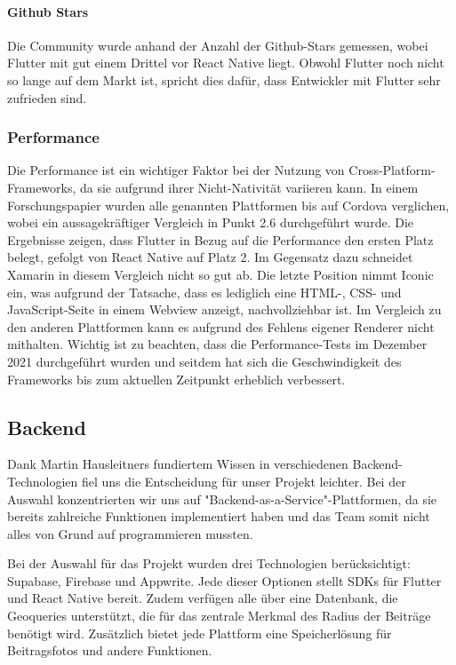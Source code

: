 \paragraph{Github Stars}
Die Community wurde anhand der Anzahl der Github-Stars gemessen, wobei Flutter mit gut einem Drittel vor React Native liegt. Obwohl Flutter noch nicht so lange auf dem Markt ist, spricht dies dafür, dass Entwickler mit Flutter sehr zufrieden sind.

\subsubsection{Performance}
Die Performance ist ein wichtiger Faktor bei der Nutzung von Cross-Platform-Frameworks, da sie aufgrund ihrer Nicht-Nativität variieren kann. In einem Forschungspapier \cite{Anwar2021} wurden alle genannten Plattformen bis auf Cordova verglichen, wobei ein aussagekräftiger Vergleich in Punkt 2.6 durchgeführt wurde. Die Ergebnisse zeigen, dass Flutter in Bezug auf die Performance den ersten Platz belegt, gefolgt von React Native auf Platz 2. Im Gegensatz dazu schneidet Xamarin in diesem Vergleich nicht so gut ab. Die letzte Position nimmt Iconic ein, was aufgrund der Tatsache, dass es lediglich eine HTML-, CSS- und JavaScript-Seite in einem Webview anzeigt, nachvollziehbar ist. Im Vergleich zu den anderen Plattformen kann es aufgrund des Fehlens eigener Renderer nicht mithalten.
Wichtig ist zu beachten, dass die Performance-Tests im Dezember 2021 durchgeführt wurden und seitdem hat sich die Geschwindigkeit des Frameworks bis zum aktuellen Zeitpunkt erheblich verbessert.


\subsection
{Backend}
Dank Martin Hausleitners fundiertem Wissen in verschiedenen Backend-Technologien fiel uns die Entscheidung für unser Projekt leichter. Bei der Auswahl konzentrierten wir uns auf "Backend-as-a-Service"-Plattformen, da sie bereits zahlreiche Funktionen implementiert haben und das Team somit nicht alles von Grund auf programmieren mussten.

Bei der Auswahl für das Projekt wurden drei Technologien berücksichtigt: Supabase, Firebase und Appwrite. Jede dieser Optionen stellt SDKs für Flutter und React Native bereit. Zudem verfügen alle über eine Datenbank, die Geoqueries unterstützt, die für das zentrale Merkmal des Radius der Beiträge benötigt wird. Zusätzlich bietet jede Plattform eine Speicherlösung für Beitragsfotos und andere Funktionen.

